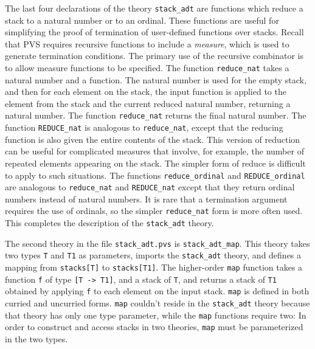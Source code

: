 The last four declarations of the theory \texttt{stack\_adt} are functions
which reduce a stack to a natural number or to an ordinal.  These
functions are useful for simplifying the proof of termination of
user-defined functions over stacks.  Recall that PVS requires recursive
functions to include a \emph{measure}, which is used to generate
termination conditions.  The primary use of the recursive combinator is to
allow measure functions to be specified.  The function
\texttt{reduce\_nat} takes a natural number and a function.  The natural
number is used for the empty stack, and then for each element on the
stack, the input function is applied to the element from the stack and the
current reduced natural number, returning a natural number.  The function
\texttt{reduce\_nat} returns the final natural number.  The function
\texttt{REDUCE\_nat} is analogous to \texttt{reduce\_nat}, except that the
reducing function is also given the entire contents of the stack.  This
version of reduction can be useful for complicated measures that involve,
for example, the number of repeated elements appearing on the stack.  The
simpler form of reduce is difficult to apply to such situations.  The
functions \texttt{reduce\_ordinal} and \texttt{REDUCE\_ordinal} are
analogous to \texttt{reduce\_nat} and \texttt{REDUCE\_nat} except that
they return ordinal numbers instead of natural numbers.  It is rare that a
termination argument requires the use of ordinals, so the simpler
\texttt{reduce\_nat} form is more often used.  This completes the
description of the \texttt{stack\_adt} theory.

The second theory in the file \texttt{stack\_adt.pvs} is
\texttt{stack\_adt\_map}.  This theory takes two types \texttt{T} and
\texttt{T1} as parameters, imports the \texttt{stack\_adt} theory, and
defines a mapping from \texttt{stacks[T]} to \texttt{stacks[T1]}.  The
higher-order \texttt{map} function takes a function \texttt{f} of type
\texttt{[T -> T1]}, and a stack of \texttt{T}, and returns a stack of
\texttt{T1} obtained by applying \texttt{f} to each element on the input
stack.  \texttt{map} is defined in both curried and uncurried forms.
\texttt{map} couldn't reside in the \texttt{stack\_adt} theory because
that theory has only one type parameter, while the \texttt{map} functions
require two: In order to construct and access stacks in two theories,
\texttt{map} must be parameterized in the two types.

